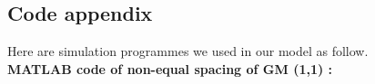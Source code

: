 \begin{appendices}
	
	\section*{Code appendix} %
	
	Here are simulation programmes we used in our model as follow.\\
	
	
	
	\textbf{\textcolor[rgb]{0.98,0.00,0.00}{MATLAB code of non-equal spacing of GM (1,1) :}}
	


\end{appendices}
